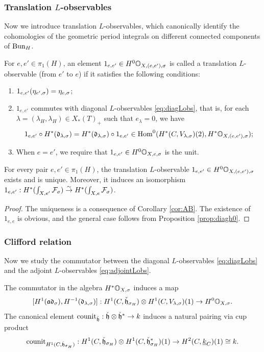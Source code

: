 \documentclass[reqno]{amsart}
\numberwithin{equation}{section}
\numberwithin{equation}{section}
\begin{document}
\subsubsection{Translation \texorpdfstring{$L$}{L}-observables}
Now we introduce translation $L$-observables, which canonically identify the cohomologies of the geometric period integrals on different connected components of $\operatorname{Bun}_H$.
\begin{defn}\label{defn:translationLobs}
    For $e,e'\in \pi_1(H)$, an element $1_{e,e'}\in H^0\mathbb{O}_{X,(e,e'),\sigma}$ is called a translation $L$-observable (from $e'$ to $e$) if it satisfies the following conditions:
    \begin{enumerate}
        \item $1_{e,e'}(\eta_{e',\sigma})=\eta_{e,\sigma}$;
        \item $1_{e,e'}$ commutes with diagonal $L$-observables \eqref{eq:diagLobs}, that is, for each $\lambda=(\lambda_H,\lambda_H)\in X_*(T)_+$ such that $e_{\lambda}=0$, we have \[1_{e,e'}\circ H^*(\mathfrak{d}_{\lambda,\sigma})=H^*(\mathfrak{d}_{\lambda,\sigma})\circ 1_{e,e'} \in \operatorname{Hom}^0( H^*(C,V_{\lambda,\sigma})(2), H^*\mathbb{O}_{X,(e,e'),\sigma});\]
        \item When $e=e'$, we require that $1_{e,e'}\in H^0\mathbb{O}_{X,e,\sigma}$ is the unit.
    \end{enumerate}
\end{defn}

\begin{prop}
    For every pair $e,e'\in \pi_1(H)$, the translation $L$-observable $1_{e,e'}\in H^0\mathbb{O}_{X,(e,e'),\sigma}$ exists and is unique. Moreover, it induces an isomorphism $1_{e,e'}:H^*(\int_{X,e'}\mathcal{F}_{\sigma})\stackrel{\sim}{\to} H^*(\int_{X,e}\mathcal{F}_{\sigma})$.
\end{prop}

\begin{proof}
    The uniqueness is a consequence of Corollary \ref{cor:AB}. The existence of $1_{e,e}$ is obvious, and the general case follows from Proposition \ref{prop:diagh0}.
\end{proof}




\subsubsection{Clifford relation}
Now we study the commutator between the diagonal $L$-observables \eqref{eq:diagLobs} and the adjoint $L$-observables \eqref{eq:adjointLobs}.

The commutator in the algebra $H^*\mathbb{O}_{X,\sigma}$ induces a map \begin{equation}\label{eq:commutatorLobs}
    [H^1(\mathfrak{a}\mathfrak{d}_{\sigma}),H^{-1}(\mathfrak{d}_{\lambda,\sigma})]:H^1(C,\check{\mathfrak{h}}_{\sigma_H})\otimes H^1(C,V_{\lambda,\sigma})(1)\to H^0\mathbb{O}_{X,\sigma}. \end{equation}
The canonical element $\mathrm{counit}_{\check{\mathfrak{h}}}: \check{\mathfrak{h}}\otimes \check{\mathfrak{h}}^*\to k$ induces a natural pairing via cup product \begin{equation}\label{eq:couniths}\mathrm{counit}_{H^1(C,\check{\mathfrak{h}}_{\sigma_H})}: H^1(C,\check{\mathfrak{h}}_{\sigma_H}) \otimes H^1(C,\check{\mathfrak{h}}_{\sigma_H}^*)(1) \to H^2(C,\underline{k}_C)(1) \cong k.\end{equation}
\end{document}
